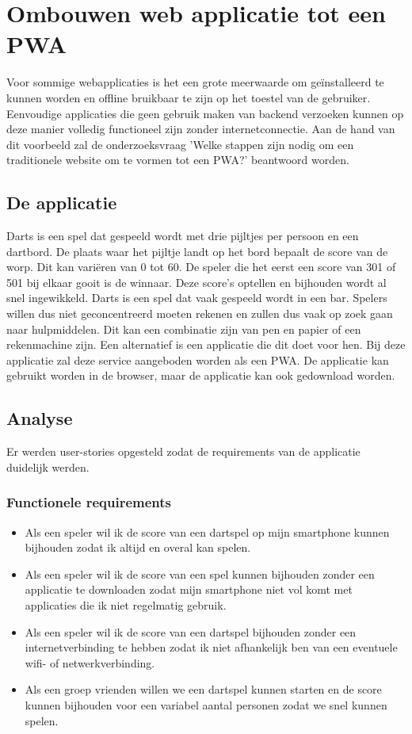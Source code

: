 \chapter{Ombouwen web applicatie tot een PWA}
\label{ch:TransformerenNaarEenPWA}

Voor sommige webapplicaties is het een grote meerwaarde om geïnstalleerd te kunnen worden  en offline bruikbaar te zijn op het toestel van de gebruiker.\autocite{Mozilla2020c} Eenvoudige applicaties die geen gebruik maken van backend verzoeken kunnen op deze manier volledig functioneel zijn zonder internetconnectie. 
Aan de hand van dit voorbeeld zal de onderzoeksvraag 'Welke stappen zijn nodig om een traditionele website om te vormen tot een PWA?' beantwoord worden.

\section{De applicatie}

	Darts is een spel dat gespeeld wordt met drie pijltjes per persoon en een dartbord. De plaats waar het pijltje landt op het bord bepaalt de score van de worp. Dit kan variëren van 0 tot 60. De speler die het eerst een score van 301 of  501 bij elkaar gooit is de winnaar. Deze score’s optellen en bijhouden wordt al snel ingewikkeld. Darts is een spel dat vaak gespeeld wordt in een bar. Spelers willen dus niet geconcentreerd moeten rekenen en zullen dus vaak op zoek gaan naar hulpmiddelen. Dit kan een combinatie zijn van pen en papier of een rekenmachine zijn. Een alternatief is een applicatie die dit doet voor hen. Bij deze applicatie zal deze service aangeboden worden als een PWA. De applicatie kan gebruikt worden in de browser, maar de applicatie kan ook gedownload worden.

\section{Analyse}

	Er werden user-stories opgesteld zodat de requirements van de applicatie duidelijk werden.  
	
	\subsection{Functionele requirements}
		\begin{itemize}
			 \item 	Als een speler wil ik de score van een dartspel op mijn smartphone kunnen bijhouden zodat ik altijd en overal kan spelen.
			 \item 	Als een speler wil ik de score van een spel kunnen bijhouden zonder een applicatie te downloaden zodat mijn smartphone niet vol komt met applicaties die ik niet regelmatig gebruik.
			 \item 	Als een speler wil ik de score van een dartspel bijhouden zonder een internetverbinding te hebben zodat ik niet afhankelijk ben van een eventuele wifi-  of netwerkverbinding.
			 \item 	Als een groep vrienden willen we een dartspel kunnen starten en de score kunnen bijhouden voor een variabel aantal personen zodat we snel kunnen spelen.
		\end{itemize}	
	
